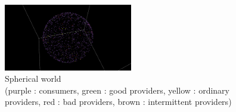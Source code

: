 \begin{figure}[h!]
\centering
\captionsetup{justification=centering}
\includegraphics[width=0.5\textwidth]{images/world.png}
\caption{Spherical world \\(purple : consumers, green : good providers, yellow : ordinary providers, red : bad providers, brown : intermittent providers)}
\label{fig:universe}
\end{figure}
